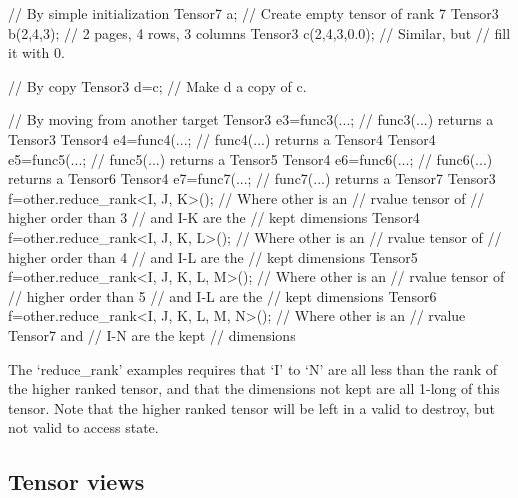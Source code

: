 \begin{code}
// By simple initialization
Tensor7 a;            // Create empty tensor of rank 7
Tensor3 b(2,4,3);     // 2 pages, 4 rows, 3 columns
Tensor3 c(2,4,3,0.0); // Similar, but
                      // fill it with 0.

// By copy
Tensor3 d=c;          // Make d a copy of c.

// By moving from another target
Tensor3 e3=func3(...;  // func3(...) returns a Tensor3
Tensor4 e4=func4(...;  // func4(...) returns a Tensor4
Tensor4 e5=func5(...;  // func5(...) returns a Tensor5
Tensor4 e6=func6(...;  // func6(...) returns a Tensor6
Tensor4 e7=func7(...;  // func7(...) returns a Tensor7
Tensor3 f=other.reduce_rank<I, J, K>();  // Where other is an
                                         // rvalue tensor of
                                         // higher order than 3
                                         // and I-K are the
                                         // kept dimensions
Tensor4 f=other.reduce_rank<I, J, K, L>();  // Where other is an
                                         // rvalue tensor of
                                         // higher order than 4
                                         // and I-L are the
                                         // kept dimensions
Tensor5 f=other.reduce_rank<I, J, K, L, M>();  // Where other is an
                                         // rvalue tensor of
                                         // higher order than 5
                                         // and I-L are the
                                         // kept dimensions
Tensor6 f=other.reduce_rank<I, J, K, L, M, N>();  // Where other is an
                                         // rvalue Tensor7 and
                                         // I-N are the kept
                                         // dimensions
\end{code}

The `reduce\_rank' examples requires that `I' to `N' are all less than the rank of the 
higher ranked tensor,
and that the dimensions not kept are all 1-long of this tensor.  Note that the
higher ranked tensor will be left in a valid to destroy, but not valid to access state.

\subsection{Tensor views}


